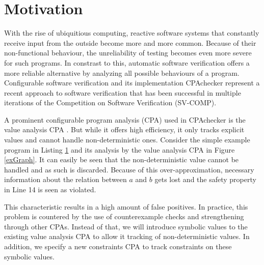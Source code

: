 \section{Motivation}
With the rise of ubiquitious computing, reactive software systems that constantly receive input from the outside become more and more common.
Because of their non\--func\-tio\-nal behaviour, the unreliability of testing becomes even more severe for such programs.
In constrast to this, automatic software verification offers a more reliable alternative by analyzing all possible behaviours of a program.
Configurable software verification\cite{Beyer2007} and its implementation CPAchecker\cite{Beyer2011} represent a recent approach to software verification that has been successful in
multiple iterations of the Competition on Software Verification (SV-COMP).

A prominent configurable program analysis (CPA) used in CPAchecker is the value analysis CPA \cite{Beyer2012}.
But while it offers high efficiency, it only tracks explicit values and cannot handle non-deterministic ones.
Consider the simple example program in Listing \ref{exProg} and its analysis by the value analysis CPA in Figure \ref{exGraph}.
It can easily be seen that the non-deterministic value cannot be handled and as such is discarded.
Because of this over-approximation, necessary information about the relation between $a$ and $b$ gets lost and the safety property in Line 14 is seen as violated.

\begin{figure}[h]
\label{exProg}
\lstset{numbers=left}

\end{figure}

This characteristic results in a high amount of false positives.
In practice, this problem is countered by the use of counterexample checks and strengthening through other CPAs.
Instead of that, we will introduce symbolic values to the existing value analysis CPA to allow it tracking of non-deterministic values.
In addition, we specify a new constraints CPA to track constraints on these symbolic values.

